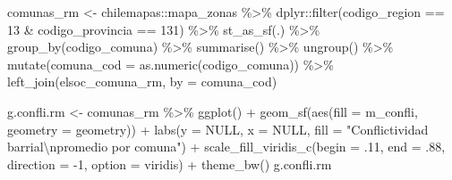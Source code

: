 \documentclass[
  12pt,
]{book}
\newenvironment{Shaded}{\begin{snugshade}}{\end{snugshade}}
\newcommand{\AttributeTok}[1]{\textcolor[rgb]{0.77,0.63,0.00}{#1}}
\newcommand{\ConstantTok}[1]{\textcolor[rgb]{0.00,0.00,0.00}{#1}}
\newcommand{\DecValTok}[1]{\textcolor[rgb]{0.00,0.00,0.81}{#1}}
\newcommand{\FunctionTok}[1]{\textcolor[rgb]{0.00,0.00,0.00}{#1}}
\newcommand{\NormalTok}[1]{#1}
\newcommand{\OtherTok}[1]{\textcolor[rgb]{0.56,0.35,0.01}{#1}}
\newcommand{\SpecialCharTok}[1]{\textcolor[rgb]{0.00,0.00,0.00}{#1}}
\newcommand{\StringTok}[1]{\textcolor[rgb]{0.31,0.60,0.02}{#1}}
\begin{document}
\begin{Shaded}
\begin{Highlighting}[]
\NormalTok{comunas\_rm }\OtherTok{\textless{}{-}}\NormalTok{ chilemapas}\SpecialCharTok{::}\NormalTok{mapa\_zonas }\SpecialCharTok{\%\textgreater{}\%}   
\NormalTok{  dplyr}\SpecialCharTok{::}\FunctionTok{filter}\NormalTok{(codigo\_region }\SpecialCharTok{==} \StringTok{\textquotesingle{}13\textquotesingle{}} \SpecialCharTok{\&}\NormalTok{ codigo\_provincia }\SpecialCharTok{==} \StringTok{\textquotesingle{}131\textquotesingle{}}\NormalTok{) }\SpecialCharTok{\%\textgreater{}\%} 
  \FunctionTok{st\_as\_sf}\NormalTok{(.) }\SpecialCharTok{\%\textgreater{}\%} 
  \FunctionTok{group\_by}\NormalTok{(codigo\_comuna) }\SpecialCharTok{\%\textgreater{}\%} 
  \FunctionTok{summarise}\NormalTok{() }\SpecialCharTok{\%\textgreater{}\%} 
  \FunctionTok{ungroup}\NormalTok{() }\SpecialCharTok{\%\textgreater{}\%} 
  \FunctionTok{mutate}\NormalTok{(}\AttributeTok{comuna\_cod =} \FunctionTok{as.numeric}\NormalTok{(codigo\_comuna)) }\SpecialCharTok{\%\textgreater{}\%} 
  \FunctionTok{left\_join}\NormalTok{(elsoc\_comuna\_rm, }\AttributeTok{by =} \StringTok{\textquotesingle{}comuna\_cod\textquotesingle{}}\NormalTok{)}

\NormalTok{g.confli.rm }\OtherTok{\textless{}{-}}\NormalTok{ comunas\_rm }\SpecialCharTok{\%\textgreater{}\%}
  \FunctionTok{ggplot}\NormalTok{() }\SpecialCharTok{+} 
  \FunctionTok{geom\_sf}\NormalTok{(}\FunctionTok{aes}\NormalTok{(}\AttributeTok{fill =}\NormalTok{ m\_confli, }\AttributeTok{geometry =}\NormalTok{ geometry)) }\SpecialCharTok{+}
  \FunctionTok{labs}\NormalTok{(}\AttributeTok{y =} \ConstantTok{NULL}\NormalTok{, }\AttributeTok{x =} \ConstantTok{NULL}\NormalTok{, }\AttributeTok{fill =} \StringTok{"Conflictividad barrial}\SpecialCharTok{\textbackslash{}n}\StringTok{promedio por comuna"}\NormalTok{) }\SpecialCharTok{+}
  \FunctionTok{scale\_fill\_viridis\_c}\NormalTok{(}\AttributeTok{begin =}\NormalTok{ .}\DecValTok{11}\NormalTok{, }\AttributeTok{end =}\NormalTok{ .}\DecValTok{88}\NormalTok{, }\AttributeTok{direction =} \SpecialCharTok{{-}}\DecValTok{1}\NormalTok{, }\AttributeTok{option =} \StringTok{\textquotesingle{}viridis\textquotesingle{}}\NormalTok{) }\SpecialCharTok{+}
  \FunctionTok{theme\_bw}\NormalTok{()}
\NormalTok{g.confli.rm}
\end{Highlighting}
\end{Shaded}
\end{document}
